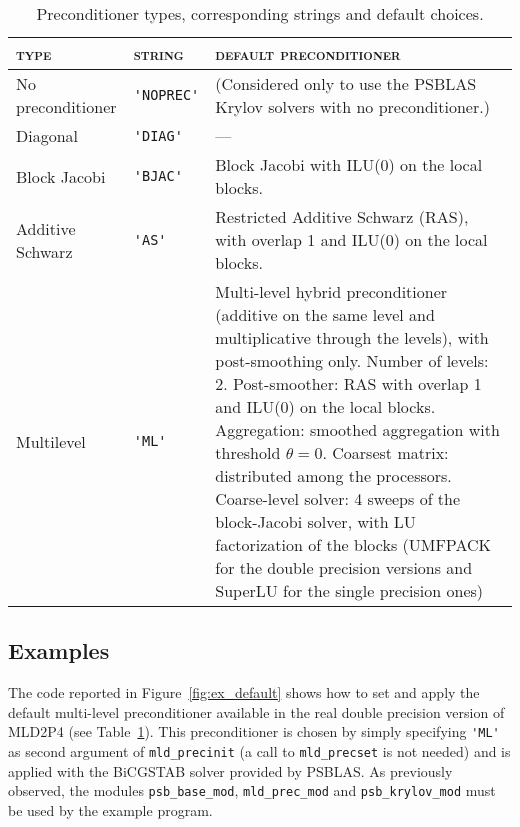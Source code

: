 \begin{table}[th]
\begin{center}
\begin{tabular}{|l|l|p{6.4cm}|}
\hline
\textsc{type}       & \textsc{string} & \textsc{default preconditioner} \\ \hline
No preconditioner &\verb|'NOPREC'|& (Considered only to use the PSBLAS
                                    Krylov solvers with no preconditioner.) \\
Diagonal          & \verb|'DIAG'| & --- \\
Block Jacobi      & \verb|'BJAC'| & Block Jacobi with ILU(0) on the local blocks.\\ 
Additive Schwarz  & \verb|'AS'|   & Restricted Additive Schwarz (RAS),
                                    with overlap 1 and ILU(0) on the local blocks. \\ 
Multilevel        &\verb|'ML'|    & Multi-level hybrid preconditioner (additive on the
                                    same level and multiplicative through the levels),
                                    with post-smoothing only.
                                    Number of levels: 2.
	                                  Post-smoother: RAS with overlap 1 and ILU(0)
                                    on the local blocks.
                                    Aggregation: smoothed aggregation with
                                    threshold $\theta = 0$.
                                    Coarsest matrix: distributed among the processors.
                                    Coarse-level solver: 
                                    4 sweeps of the block-Jacobi solver, 
                                    with LU factorization of the blocks
                                    (UMFPACK for the double precision versions and
                                    SuperLU for the single precision ones)         \\
\hline
\end{tabular}
\end{center}

\caption{Preconditioner types, corresponding strings and default choices.
\label{tab:precinit}}
\end{table}

\subsection{Examples\label{sec:examples}}

The code reported in Figure~\ref{fig:ex_default} shows how to set and apply the default
multi-level preconditioner available in the real double precision version
of MLD2P4 (see Table~\ref{tab:precinit}). This preconditioner is chosen
by simply specifying \verb|'ML'| as second argument of \verb|mld_precinit|
(a call to \verb|mld_precset| is not needed) and is applied with the BiCGSTAB
solver provided by PSBLAS. As previously observed, the modules \verb|psb_base_mod|,
\verb|mld_prec_mod| and \verb|psb_krylov_mod| must be used by the example program.
 
